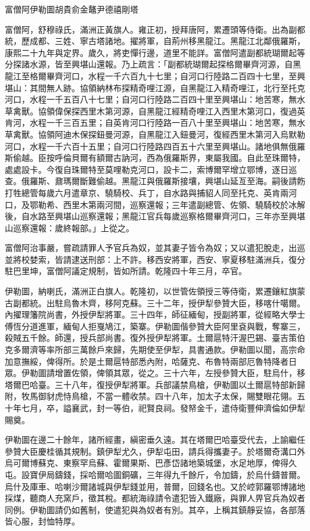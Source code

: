 
\begin{pinyinscope}
富僧阿伊勒圖胡貴俞金鼇尹德禧剛塔

富僧阿，舒穆祿氏，滿洲正黃旗人。雍正初，授拜唐阿，累遷頭等侍衛。出為副都統，歷成都、三姓、寧古塔諸地。擢將軍，自荊州移黑龍江。黑龍江北鄰俄羅斯，康熙二十九年與定界。歲久，將吏憚行邊，道里不能詳。富僧阿遣副都統瑚爾起等分探諸水源，皆至興堪山還報。乃上疏言：「副都統瑚爾起探格爾畢齊河源，自黑龍江至格爾畢齊河口，水程一千六百九十七里；自河口行陸路二百四十七里，至興堪山：其間無人跡。協領納林布探精奇哩江源，自黑龍江入精奇哩江，北行至托克河口，水程一千五百八十七里；自河口行陸路二百四十里至興堪山：地苦寒，無水草禽獸。協領偉保探西里木第河源，自黑龍江經精奇哩江入西里木第河口，復過英肯河，水程一千三百五里；自英肯河口行陸路一百八十里至興堪山：地苦寒，無水草禽獸。協領阿迪木保探鈕曼河源，自黑龍江入鈕曼河，復經西里木第河入烏默勒河口，水程一千六百十五里；自河口行陸路四百五十六里至興堪山。諸地俱無俄羅斯偷越。臣按呼倫貝爾有額爾古訥河，西為俄羅斯界，東屬我國。自此至珠爾特，處處設卡。今復自珠爾特至莫哩勒克河口，設卡二，索博爾罕增立鄂博，逐日巡查。俄羅斯、鼐瑪爾斷難偷越。黑龍江與俄羅斯接壤，興堪山延亙至海。嗣後請飭打牲總管每歲六月遣章京、驍騎校、兵丁，自水路與捕貂人同至托克、英肯兩河口，及鄂勒希、西里木第兩河間，巡察還報；三年遣副總管、佐領、驍騎校於冰解後，自水路至興堪山巡察還報；黑龍江官兵每歲巡察格爾畢齊河口，三年亦至興堪山巡察還報：歲終報部。」上從之。

富僧阿治事嚴，嘗疏請罪人予官兵為奴，並其妻子皆令為奴；又以遣犯脫走，出巡並將校婪索，皆請逮送刑部：上不許。移西安將軍，西安、寧夏移駐滿洲兵，復分駐巴里坤，富僧阿議定規制，皆如所請。乾隆四十年三月，卒官。

伊勒圖，納喇氏，滿洲正白旗人。乾隆初，以世管佐領授三等侍衛，累遷鑲紅旗蒙古副都統。出駐烏魯木齊，移阿克蘇。三十二年，授伊犁參贊大臣，移喀什噶爾。內擢理籓院尚書，外授伊犁將軍。三十四年，師征緬甸，授副將軍，從經略大學士傅恆分道進軍，緬甸人拒戛鳩江，築寨。伊勒圖偕參贊大臣阿里袞與戰，奪寨三，殺賊五千餘。師還，授兵部尚書。復外授伊犁將軍。土爾扈特汗渥巴錫、臺吉策伯克多爾濟等率所部三萬餘戶來歸，先期使至伊犁，具書通款。伊勒圖以聞，高宗命加意撫綏，俾得所。於是土爾扈特部悉內附，哈薩克、布魯特兩部厄魯特降者日眾。伊勒圖請增置佐領，俾領其眾，從之。三十六年，左授參贊大臣，駐烏什，移塔爾巴哈臺。三十八年，復授伊犁將軍。兵部議禁鳥槍，伊勒圖以土爾扈特部新歸附，牧馬御豺虎恃鳥槍，不當一體收禁。四十八年，加太子太保，賜雙眼花翎。五十年七月，卒，謚襄武，封一等伯，祀賢良祠。發帑金千，遣侍衛豐伸濟倫如伊犁賜奠。

伊勒圖在邊二十餘年，諸所經畫，縝密垂久遠。其在塔爾巴哈臺受代去，上諭繼任參贊大臣慶桂循其規制。鎮伊犁尤久，伊犁屯田，請兵得攜妻子。於塔爾奇溝口外烏可爾博蘇克、東察罕烏蘇、霍爾果斯、巴彥岱諸地築城堡，水足地厚，俾得久屯。設寶伊局鑄錢，採哈爾哈圖銅礦，三年得九千餘斤，令加鑄，於烏什鑄普爾。烏什及庫車、哈喇沙爾諸城與伊犁錢並用，普爾，回錢名也。又於崆郭羅鄂博諸地採煤，聽商人充窯戶，徵其稅。都統海祿請令遣犯皆入鐵廠，與罪人畀官兵為奴者同例。伊勒圖請仍如舊制，使遣犯與為奴者有別。其卒，上稱其鎮靜妥協，各部落皆心服，封恤特厚。


\end{pinyinscope}
